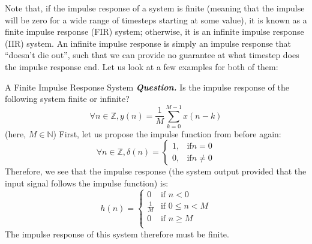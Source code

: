 Note that, if the impulse response of a system is finite (meaning that the impulse will be zero for a wide range of timesteps starting at some value), it is known as a finite impulse response (FIR) system; otherwise, it is an infinite impulse response (IIR) system.
An infinite impulse response is simply an impulse response that ``doesn't die out'', such that we can provide no guarantee at what timestep does the impulse response end.
Let us look at a few examples for both of them:
\begin{ln-example}{A Finite Impulse Response System}{}
    \textbf{\textit{Question.}} Is the impulse response of the following system finite or infinite?
    \[
        \forall n \in \mathbb{Z}, y(n) = \frac{1}{M} \sum_{k = 0}^{M - 1} x(n - k)
    \]
    (here, $M \in \mathbb{N}$)
    \tcblower
    First, let us propose the impulse function from before again:
    \[
        \forall n \in \mathbb{Z}, \delta(n) = \begin{cases}
            1, &\text{if} n = 0 \\
            0, &\text{if} n \neq 0
        \end{cases}
    \]
    Therefore, we see that the impulse response (the system output provided that the input signal follows the impulse function) is:
    \[
        h(n) = \begin{cases}
            0 &\text{if } n < 0 \\
            \frac{1}{M} &\text{if } 0 \leq n < M \\
            0 &\text{if } n \geq M \\
        \end{cases}
    \]
    The impulse response of this system therefore must be finite.
\end{ln-example}

